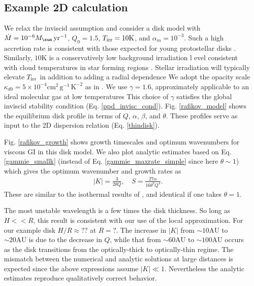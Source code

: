 \subsection{Example 2D calculation}\label{pp2d_example}
We relax the inviscid assumption and consider a disk  model with $\dot{M} = 10^{-6}M_\sun\,\yr^{-1}$, $Q_0=1.5$, 
$T_\mathrm{irr}=10\mathrm{K}$, and $\alpha_m=10^{-3}$. 
Such a high accretion rate is consistent with those expected for 
young protostellar disks \citep{shu77,enoch09}. Similarly,
$10\mathrm{K}$ is a conservatively low background irradiation l
evel consistent with cloud temperatures in star forming regions \citep{plume97,johnstone01}.
Stellar irradiation will typically elevate $T_\mathrm{irr}$ in addition to adding a radial dependence \citep{kratter08}
We adopt the opacity scale $\kappa_{d0} =
5\times10^{-4}\mathrm{cm}^2\,\mathrm{g}^{-1}\,\mathrm{K}^{-2}$  as in
. We use $\gamma=1.6$, approximately applicable
to an ideal molecular gas at low temperatures 
This choice of $\gamma$ satisfies the global inviscid stability condition
(Eq. \ref{ppd_invisc_cond}). %
Fig. \ref{rafikov_model} shows the equilibrium 
disk profile in terms of $Q$, $\alpha$, $\beta$, and $\theta$.  
These profiles serve as input to the 2D dispersion relation
(Eq. \ref{thindisk}).    

Fig. \ref{rafikov_growth} shows growth timescales and
optimum wavenumbers for viscous GI in this disk model.  
We also plot analytic estimates based on Eq. \ref{gammie_smallk} (instead of
Eq. \ref{gammie_maxrate_simple} since here $\theta\sim 1$) 
which gives the optimum wavenumber and growth rates as
\begin{align}
  |K| = \frac{3}{2\theta Q}, \quad
  S = \frac{27\alpha}{16\theta^3Q^4}. 
\end{align}
These are similar to the isothermal results of
\citet[][their Eq. 19 and 21, respectively]{sterzik95}, and identical if one
takes $\theta=1$. %
 
The most unstable wavelength is a few times the disk thickness. 
So long as $H<<R$, this result is consistent with our use of the local approximation. For
our example disk $H/R \approx ??$ at $R=?$. The
increase in $|K|$ from $\sim 10\mathrm{AU}$ to $\sim 20\mathrm{AU}$ is
due to the decrease in $Q$, while that from $\sim 60\mathrm{AU}$ to
$\sim 100\mathrm{AU}$ occurs as the disk transitions from the
optically-thick to optically-thin regime. The mismatch between the
numerical and analytic solutions at large
distances is expected since the above expressions assume $|K|\ll
1$. Nevertheless the analytic estimates reproduce qualitatively correct
behavior. 

